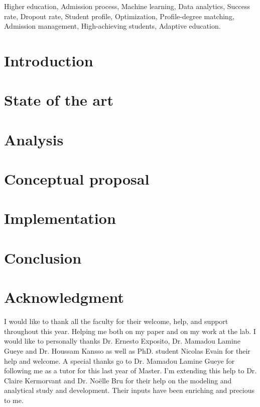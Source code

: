 \documentclass[conference]{IEEEtran}
\begin{document}
\begin{IEEEkeywords}
Higher education, Admission process, Machine learning, Data analytics, Success rate, Dropout rate, Student profile, Optimization, Profile-degree matching, Admission management, High-achieving students, Adaptive education.

\end{IEEEkeywords}
\vspace{16pt}

\section{Introduction}
\label{sec:introduction}  


\section{State of the art}
\label{sec:soa}


\section{Analysis}
\label{sec:analysis}


\section{Conceptual proposal}
\label{sec:conprop}


\section{Implementation}
\label{sec:imp}


\section{Conclusion}
\label{sec:conclusion}


\vspace{16pt}
\section{Acknowledgment}
\label{sec:aknow}
I would like to thank all the faculty for their welcome, help, and support throughout this year. Helping me both on my paper and on my work at the lab. I would like to personally thanks Dr. Ernesto Exposito, Dr. Mamadou Lamine Gueye and Dr. Houssam Kansso as well as PhD. student Nicolas Evain for their help and welcome. A special thanks go to Dr. Mamadou Lamine Gueye for following me as a tutor for this last year of Master.
I'm extending this help to Dr. Claire Kermorvant and Dr. Noëlle Bru for their help on the modeling and analytical study and development. Their inputs have been enriching and precious to me.
\end{document}
